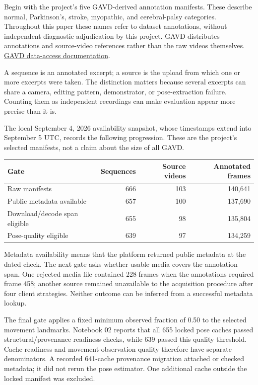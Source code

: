 \documentclass[11pt,letterpaper]{article}
\newcounter{none}
\begin{document}
Begin with the project's five GAVD-derived annotation manifests. These
describe normal, Parkinson's, stroke, myopathic, and cerebral-palsy
categories. Throughout this paper these names refer to dataset
annotations, without independent diagnostic adjudication by this
project. GAVD distributes annotations and source-video references rather
than the raw videos themselves.
\href{https://github.com/Rahmyyy/GAVD}{GAVD data-access documentation}.

A sequence is an annotated excerpt; a source is the upload from which
one or more excerpts were taken. The distinction matters because several
excerpts can share a camera, editing pattern, demonstrator, or
pose-extraction failure. Counting them as independent recordings can
make evaluation appear more precise than it is.

The local September 4, 2026 availability snapshot, whose timestamps
extend into September 5 UTC, records the following progression. These
are the project's selected manifests, not a claim about the size of all
GAVD.

\begin{minipage}{\linewidth}

{\def\LTcaptype{none} %
\begin{longtable}[]{@{}lrrr@{}}
\toprule\noalign{}
Gate & Sequences & Source videos & Annotated frames \\
\midrule\noalign{}
\endhead
\bottomrule\noalign{}
\endlastfoot
Raw manifests & 666 & 103 & 140,641 \\
Public metadata available & 657 & 100 & 137,690 \\
Download/decode span eligible & 655 & 98 & 135,804 \\
Pose-quality eligible & 639 & 97 & 134,259 \\
\end{longtable}
}

\end{minipage}

Metadata availability means that the platform returned public metadata
at the dated check. The next gate asks whether usable media covers the
annotation span. One rejected media file contained 228 frames when the
annotations required frame 458; another source remained unavailable to
the acquisition procedure after four client strategies. Neither outcome
can be inferred from a successful metadata lookup.

The final gate applies a fixed minimum observed fraction of 0.50 to the
selected movement landmarks. Notebook 02 reports that all 655 locked
pose caches passed structural/provenance readiness checks, while 639
passed this quality threshold. Cache readiness and movement-observation
quality therefore have separate denominators. A recorded 641-cache
provenance migration attached or checked metadata; it did not rerun the
pose estimator. One additional cache outside the locked manifest was
excluded.
\end{document}
